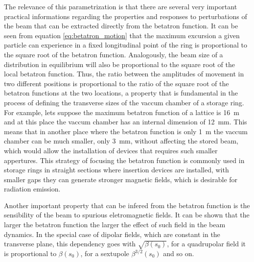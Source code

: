 \documentclass[
	12pt,				%
	openright,			%
	oneside,			%
	a4paper,		%
	chapter=TITLE,		%
	section=TITLE,		%
    brazil,				%
	english,			%
	sumario=tradicional,
	]{abntex2}
\begin{document}
	The relevance of this parametrization is that there are several very important practical informations regarding the properties and responses to perturbations of the beam that can be extracted directly from the betatron function. It can be seen from equation \eqref{eq:betatron_motion} that the maximum excursion a given particle can experience in a fixed longitudinal point of the ring is proportional to the square root of the betatron function. Analogously, the beam size of a distribution in equilibrium will also be proportional to the square root of the local betatron function. Thus, the ratio between the amplitudes of movement in two different positions is proportional to the ratio of the square root of the betatron functions at the two locations, a property that is fundamental in the process of defining the transverse sizes of the vaccum chamber of a storage ring. For example, lets suppose the maximum betatron function of a lattice is \SI{16}{\meter} and at this place the vaccum chamber has an internal dimension of \SI{12}{\milli\meter}. This means that in another place where the betatron function is only \SI{1}{\meter} the vaccum chamber can be much smaller, only \SI{3}{\milli\meter}, without affecting the stored beam, which would allow the installation of devices that requires such smaller appertures. This strategy of focusing the betatron function is commonly used in storage rings in straight sections where insertion devices are installed, with smaller gaps they can generate stronger magnetic fields, which is desirable for radiation emission.

	Another important property that can be infered from the betatron function is the sensibility of the beam to spurious eletromagnetic fields. It can be shown that the larger the betatron function the larger the effect of such field in the beam dynamics. In the special case of dipolar fields, which are constant in the transverse plane, this dependency goes with $\sqrt{\beta(s_0)}$, for a quadrupolar field it is proportional to $\beta(s_0)$, for a sextupole $\beta^{3/2}(s_0)$ and so on.
\end{document}

